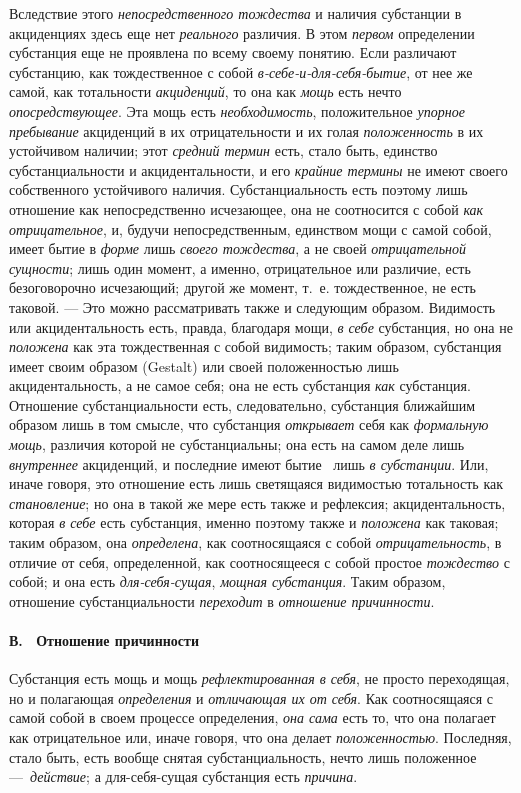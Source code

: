 Вследствие этого {\em непосредственного тождества} и
наличия субстанции в акциденциях здесь еще нет
{\em реального} различия. В этом
{\em первом} определении субстанция еще не проявлена по
всему своему понятию. Если различают субстанцию, как тождественное с собой
{\em в-себе-и-для-себя-бытие}, от нее же самой, как
тотальности {\em акциденций}, то она как
{\em мощь} есть нечто
{\em опосредствующее}. Эта мощь есть
{\em необходимость}, положительное
{\em упорное пребывание} акциденций в их
отрицательности и их голая {\em положенность} в их
устойчивом наличии; этот {\em средний термин} есть,
стало быть, единство субстанциальности и акцидентальности, и его
{\em крайние термины} не имеют своего собственного
устойчивого наличия. Субстанциальность есть поэтому лишь отношение как
непосредственно исчезающее, она не соотносится с собой
{\em как отрицательное}, и, будучи непосредственным,
единством мощи с самой собой, имеет бытие в {\em форме}
лишь {\em своего тождества}, а не своей
{\em отрицательной сущности}; лишь один момент, а
именно, отрицательное или различие, есть безоговорочно исчезающий; другой
же момент, т.~е. тождественное, не есть таковой. — Это можно рассматривать
также и следующим образом. Видимость или акцидентальность есть, правда,
благодаря мощи, {\em в себе} субстанция, но она не
{\em положена} как эта тождественная с собой видимость;
таким образом, субстанция имеет своим образом (Gestalt) или своей
положенностью лишь акцидентальность, а не самое себя; она не есть
субстанция {\em как} субстанция. Отношение
субстанциальности есть, следовательно, субстанция ближайшим образом лишь в
том смысле, что субстанция {\em открывает} себя как
{\em формальную мощь}, различия которой не
субстанциальны; она есть на самом деле лишь
{\em внутреннее} акциденций, и последние имеют бытие
\ лишь {\em в субстанции}. Или, иначе говоря, это
отношение есть лишь светящаяся видимостью тотальность как
{\em становление}; но она в такой же мере есть также и
рефлексия; акцидентальность, которая {\em в себе} есть
субстанция, именно поэтому также и {\em положена} как
таковая; таким образом, она {\em определена}, как
соотносящаяся с собой {\em отрицательность}, в отличие
от себя, определенной, как соотносящееся с собой простое
{\em тождество} с собой; и она есть
{\em для-себя-сущая}, {\em мощная
субстанция}. Таким образом, отношение субстанциальности
{\em переходит} в {\em отношение
причинности}.

\paragraph[В. \ Отношение причинности]{В. \ Отношение причинности}
\hypertarget{Toc478978770}{}Субстанция есть мощь и мощь
{\em рефлектированная в себя}, не просто переходящая,
но и полагающая {\em определения} и
{\em отличающая их от себя}. Как соотносящаяся с самой
собой в своем процессе определения, {\em она сама} есть
то, что она полагает как отрицательное или, иначе говоря, что она делает
{\em положенностью}. Последняя, стало быть, есть вообще
снятая субстанциальность, нечто лишь положенное
—~{\em действие}; а для-себя-сущая субстанция есть
{\em причина}.

